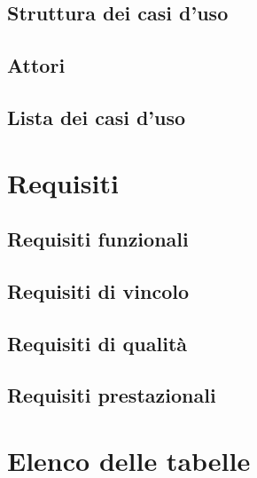 \documentclass[a4paper, 11pt]{article}
\begin{document}
\subsection{Struttura dei casi d'uso}
\subsection{Attori}
\subsection{Lista dei casi d'uso}
\pagebreak





\section{Requisiti}


\subsection{Requisiti funzionali}
\subsection{Requisiti di vincolo}
\subsection{Requisiti di qualità}
\subsection{Requisiti prestazionali}
\pagebreak

\section{Elenco delle tabelle}


































        
\end{document}
